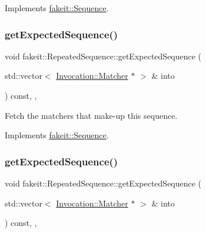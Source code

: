 Implements \mbox{\hyperlink{classfakeit_1_1Sequence_aa1a1e4ad2fcac3379ba38f250bf06884}{fakeit\+::\+Sequence}}.

\mbox{\label{classfakeit_1_1RepeatedSequence_a65b5f62fe0ba9da31b99f28c1a2e53f2}} 
\subsubsection{\texorpdfstring{getExpectedSequence()}{getExpectedSequence()}\hspace{0.1cm}{\footnotesize\ttfamily [4/9]}}
{\footnotesize\ttfamily void fakeit\+::\+Repeated\+Sequence\+::get\+Expected\+Sequence (\begin{DoxyParamCaption}\item[{std\+::vector$<$ \mbox{\hyperlink{structfakeit_1_1Invocation_1_1Matcher}{Invocation\+::\+Matcher}} $\ast$ $>$ \&}]{into }\end{DoxyParamCaption}) const\hspace{0.3cm}{\ttfamily [inline]}, {\ttfamily [override]}, {\ttfamily [virtual]}}



Fetch the matchers that make-\/up this sequence. 



Implements \mbox{\hyperlink{classfakeit_1_1Sequence_aa1a1e4ad2fcac3379ba38f250bf06884}{fakeit\+::\+Sequence}}.

\mbox{\label{classfakeit_1_1RepeatedSequence_a65b5f62fe0ba9da31b99f28c1a2e53f2}} 
\subsubsection{\texorpdfstring{getExpectedSequence()}{getExpectedSequence()}\hspace{0.1cm}{\footnotesize\ttfamily [5/9]}}
{\footnotesize\ttfamily void fakeit\+::\+Repeated\+Sequence\+::get\+Expected\+Sequence (\begin{DoxyParamCaption}\item[{std\+::vector$<$ \mbox{\hyperlink{structfakeit_1_1Invocation_1_1Matcher}{Invocation\+::\+Matcher}} $\ast$ $>$ \&}]{into }\end{DoxyParamCaption}) const\hspace{0.3cm}{\ttfamily [inline]}, {\ttfamily [override]}, {\ttfamily [virtual]}}



